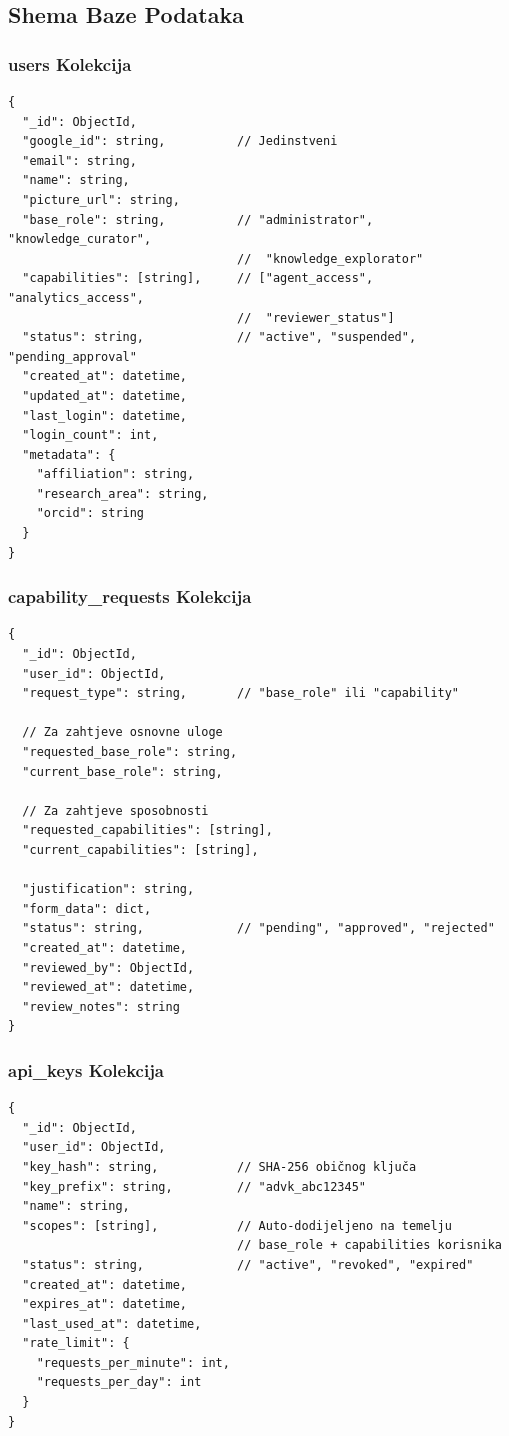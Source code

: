 \documentclass[12pt,a4paper]{article}
\begin{document}
\subsection{Shema Baze Podataka}

\subsubsection{users Kolekcija}
\begin{verbatim}
{
  "_id": ObjectId,
  "google_id": string,          // Jedinstveni
  "email": string,
  "name": string,
  "picture_url": string,
  "base_role": string,          // "administrator", "knowledge_curator",
                                //  "knowledge_explorator"
  "capabilities": [string],     // ["agent_access", "analytics_access",
                                //  "reviewer_status"]
  "status": string,             // "active", "suspended", "pending_approval"
  "created_at": datetime,
  "updated_at": datetime,
  "last_login": datetime,
  "login_count": int,
  "metadata": {
    "affiliation": string,
    "research_area": string,
    "orcid": string
  }
}
\end{verbatim}

\subsubsection{capability\_requests Kolekcija}
\begin{verbatim}
{
  "_id": ObjectId,
  "user_id": ObjectId,
  "request_type": string,       // "base_role" ili "capability"
  
  // Za zahtjeve osnovne uloge
  "requested_base_role": string,
  "current_base_role": string,
  
  // Za zahtjeve sposobnosti
  "requested_capabilities": [string],
  "current_capabilities": [string],
  
  "justification": string,
  "form_data": dict,
  "status": string,             // "pending", "approved", "rejected"
  "created_at": datetime,
  "reviewed_by": ObjectId,
  "reviewed_at": datetime,
  "review_notes": string
}
\end{verbatim}

\subsubsection{api\_keys Kolekcija}
\begin{verbatim}
{
  "_id": ObjectId,
  "user_id": ObjectId,
  "key_hash": string,           // SHA-256 običnog ključa
  "key_prefix": string,         // "advk_abc12345"
  "name": string,
  "scopes": [string],           // Auto-dodijeljeno na temelju
                                // base_role + capabilities korisnika
  "status": string,             // "active", "revoked", "expired"
  "created_at": datetime,
  "expires_at": datetime,
  "last_used_at": datetime,
  "rate_limit": {
    "requests_per_minute": int,
    "requests_per_day": int
  }
}
\end{verbatim}
\end{document}
